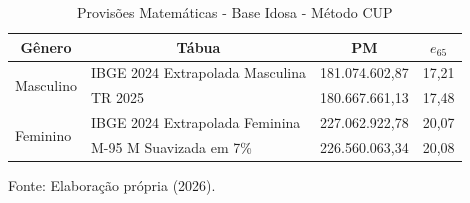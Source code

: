 \begin{table}[htbp]
    \centering
    \caption{Provisões Matemáticas - Base Idosa - Método CUP}
    \begin{threeparttable}
    \renewcommand{\arraystretch}{1.0}
    \begin{tabular}{llrr}
    \toprule
    \multicolumn{1}{c}{\textbf{Gênero}} & \multicolumn{1}{c}{\textbf{Tábua}} & \multicolumn{1}{c}{\textbf{PM}} & \multicolumn{1}{c}{\textbf{$e_{65}$}} \\ \midrule
    \multirow{2}{*}{Masculino} & IBGE 2024 Extrapolada Masculina & 181.074.602,87 & 17,21 \\
                                & TR 2025 & 180.667.661,13 & 17,48 \\ \hline
    \multirow{2}{*}{Feminino} & IBGE 2024 Extrapolada Feminina & 227.062.922,78 & 20,07 \\
                                & M-95 M Suavizada em 7\% & 226.560.063,34 & 20,08 \\ \bottomrule
    \end{tabular}
    \begin{tablenotes}[flushleft]
        \small
        \item Fonte: Elaboração própria (2026).
    \end{tablenotes}
    \end{threeparttable}
    \label{tab:idosa-CUP}
\end{table}

